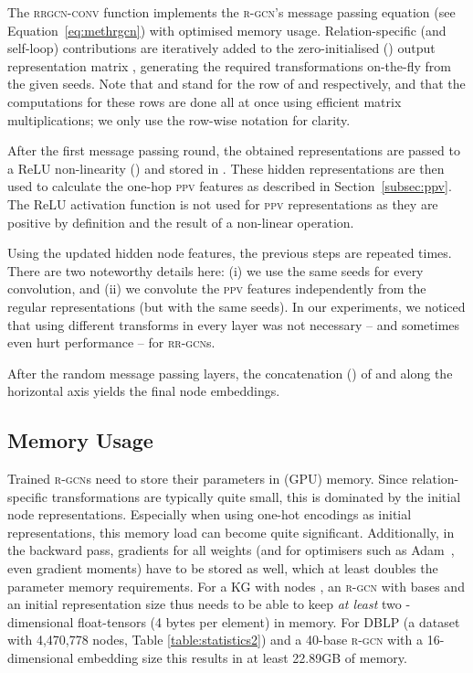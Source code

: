 \documentclass{llncs}
\begin{document}
The \textsc{rrgcn-conv} function implements the \textsc{r-gcn}'s message passing equation (see Equation~\ref{eq:methrgcn}) with optimised memory usage. Relation-specific (and self-loop) contributions are iteratively added to the zero-initialised () output representation matrix , generating the required transformations on-the-fly from the given seeds. Note that  and  stand for the  row of  and  respectively, and that the computations for these rows are done all at once using efficient matrix multiplications; we only use the row-wise notation for clarity.

After the first message passing round, the obtained representations are passed to a ReLU non-linearity () and stored in . These hidden representations are then used to calculate the one-hop \textsc{ppv} features  as described in Section~\ref{subsec:ppv}. The ReLU activation function is not used for \textsc{ppv} representations as they are positive by definition and the result of a non-linear operation.

Using the updated hidden node features, the previous steps are repeated  times. There are two noteworthy details here: (i) we use the same seeds for every convolution, and (ii) we convolute the \textsc{ppv} features independently from the regular representations (but with the same seeds). In our experiments, we noticed that using different transforms in every layer was not necessary -- and sometimes even hurt performance -- for \textsc{rr-gcn}s. 

After the random message passing layers, the concatenation () of  and  along the horizontal axis yields the final node embeddings.

\subsection{Memory Usage}
Trained \textsc{r-gcn}s need to store their parameters in (GPU) memory. Since relation-specific transformations are typically quite small, this is dominated by the initial node representations. Especially when using one-hot encodings as initial representations, this memory load can become quite significant.
Additionally, in the backward pass, gradients for all weights (and for optimisers such as Adam~\cite{kingma2014method}, even gradient moments) have to be stored as well, which at least doubles the parameter memory requirements.
For a KG with nodes , an \textsc{r-gcn} with  bases and an initial representation size  thus needs to be able to keep \textit{at least} two -dimensional float-tensors (4 bytes per element) in memory. For DBLP (a dataset with 4,470,778 nodes, Table \ref{table:statistics2}) and a 40-base \textsc{r-gcn} with a 16-dimensional embedding size this results in at least 22.89GB of memory.
\end{document}
